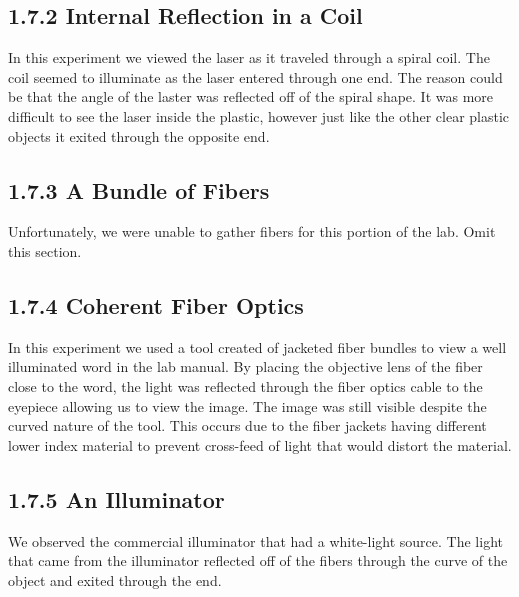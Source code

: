 \documentclass[12pt, oneside]{article}   	%
\begin{document}
\subsection*{1.7.2 Internal Reflection in a Coil}
In this experiment we viewed the laser as it traveled through a spiral coil.
The coil seemed to illuminate as the laser entered through one end.
The reason could be that the angle of the laster was reflected off of the spiral shape.
It was more difficult to see the laser inside the plastic, however just like the other clear plastic objects it exited through the opposite end.

\subsection*{1.7.3 A Bundle of Fibers}
Unfortunately, we were unable to gather fibers for this portion of the lab. Omit this section.

\subsection*{1.7.4 Coherent Fiber Optics}
In this experiment we used a tool created of jacketed fiber bundles to view a well illuminated word in the lab manual. 
By placing the objective lens of the fiber close to the word, the light was reflected through the fiber optics cable to the eyepiece allowing us to view the image.
The image was still visible despite the curved nature of the tool. 
This occurs due to the fiber jackets having different lower index material to prevent cross-feed of light that would distort the material.

\subsection*{1.7.5 An Illuminator}
We observed the commercial illuminator that had a white-light source.
The light that came from the illuminator reflected off of the fibers through the curve of the object and exited through the end.
\end{document}
